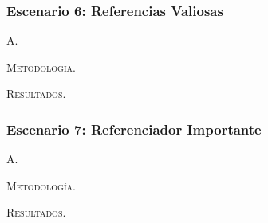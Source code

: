 \vspace{2em}
\subsubsection{Escenario 6: Referencias Valiosas} A.

\vspace{1em}
\noindent \textsc{Metodología}.  

\vspace{1em}
\noindent \textsc{Resultados}.




\vspace{2em}
\subsubsection{Escenario 7: Referenciador Importante} A.

\vspace{1em}
\noindent \textsc{Metodología}.  

\vspace{1em}
\noindent \textsc{Resultados}.